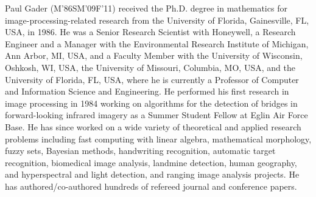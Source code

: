 \documentclass[twocolumn,english]{IEEEtran}
\theoremstyle{plain}
\begin{document}
\begin{IEEEbiography}{Paul Gader}
 (M\textquoteright 86\textendash SM\textquoteright 09\textendash F\textquoteright 11)
received the Ph.D. degree in mathematics for image-processing-related
research from the University of Florida, Gainesville, FL, USA, in
1986. He was a Senior Research Scientist with Honeywell, a Research
Engineer and a Manager with the Environmental Research Institute of
Michigan, Ann Arbor, MI, USA, and a Faculty Member with the University
of Wisconsin, Oshkosh, WI, USA, the University of Missouri, Columbia,
MO, USA, and the University of Florida, FL, USA, where he is currently
a Professor of Computer and Information Science and Engineering. He
performed his first research in image processing in 1984 working on
algorithms for the detection of bridges in forward-looking infrared
imagery as a Summer Student Fellow at Eglin Air Force Base. He has
since worked on a wide variety of theoretical and applied research
problems including fast computing with linear algebra, mathematical
morphology, fuzzy sets, Bayesian methods, handwriting recognition,
automatic target recognition, biomedical image analysis, landmine
detection, human geography, and hyperspectral and light detection,
and ranging image analysis projects. He has authored/co-authored hundreds
of refereed journal and conference papers.
\end{IEEEbiography}
\end{document}
